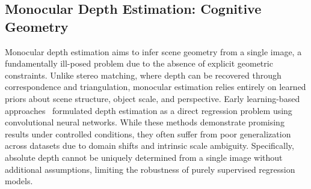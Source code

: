 \subsection{Monocular Depth Estimation: Cognitive Geometry}
Monocular depth estimation aims to infer scene geometry from a single image, a fundamentally ill-posed problem due to the absence of explicit geometric constraints.
Unlike stereo matching, where depth can be recovered through correspondence and triangulation, monocular estimation relies entirely on learned priors about scene structure, object scale, and perspective.
Early learning-based approaches~\cite{eigen2014depth,lee2019big} formulated depth estimation as a direct regression problem using convolutional neural networks.
While these methods demonstrate promising results under controlled conditions, they often suffer from poor generalization across datasets due to domain shifts and intrinsic scale ambiguity.
Specifically, absolute depth cannot be uniquely determined from a single image without additional assumptions, limiting the robustness of purely supervised regression models.

